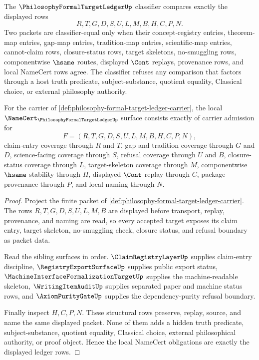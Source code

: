 
\begin{definition}
\label{def:philosophy-formal-target-ledger-classifier}
The $\PhilosophyFormalTargetLedgerUp$ classifier compares exactly the displayed rows
$$
R,T,G,D,S,U,L,M,B,H,C,P,N .
$$
Two packets are classifier-equal only when their concept-registry entries, theorem-map entries, gap-map entries, tradition-map entries, scientific-map entries, cannot-claim rows, closure-status rows, target skeletons, no-smuggling rows, componentwise $\hsame$ routes, displayed $\Cont$ replays, provenance rows, and local NameCert rows agree. The classifier refuses any comparison that factors through a host truth predicate, subject-substance, quotient equality, Classical choice, or external philosophy authority.
\end{definition}

\begin{theorem}
\label{thm:philosophy-formal-target-ledger-namecert-obligations}
For the carrier of \autoref{def:philosophy-formal-target-ledger-carrier}, the local $\NameCert_{\PhilosophyFormalTargetLedgerUp}$ surface consists exactly of carrier admission for
$$
F=(R,T,G,D,S,U,L,M,B,H,C,P,N),
$$
claim-entry coverage through $R$ and $T$, gap and tradition coverage through $G$ and $D$, science-facing coverage through $S$, refusal coverage through $U$ and $B$, closure-status coverage through $L$, target-skeleton coverage through $M$, componentwise $\hsame$ stability through $H$, displayed $\Cont$ replay through $C$, package provenance through $P$, and local naming through $N$.
\end{theorem}
\begin{proof}
Project the finite packet of \autoref{def:philosophy-formal-target-ledger-carrier}. The rows $R,T,G,D,S,U,L,M,B$ are displayed before transport, replay, provenance, and naming are read, so every accepted target exposes its claim entry, target skeleton, no-smuggling check, closure status, and refusal boundary as packet data.

Read the sibling surfaces in order. $\ClaimRegistryLayerUp$ supplies claim-entry discipline, $\RegistryExportSurfaceUp$ supplies public export status, $\MachineInterfaceFormalizationTargetUp$ supplies the machine-readable skeleton, $\WritingItemAuditUp$ supplies separated paper and machine status rows, and $\AxiomPurityGateUp$ supplies the dependency-purity refusal boundary.

Finally inspect $H,C,P,N$. These structural rows preserve, replay, source, and name the same displayed packet. None of them adds a hidden truth predicate, subject-substance, quotient equality, Classical choice, external philosophical authority, or proof object. Hence the local NameCert obligations are exactly the displayed ledger rows.
\end{proof}

